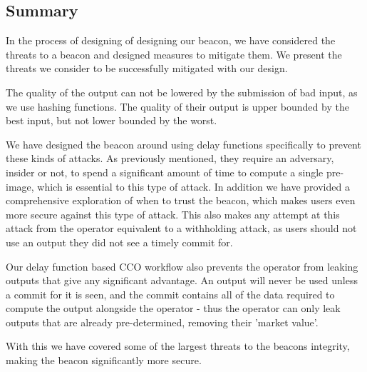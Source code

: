 \subsection{Summary}
In the process of designing of designing our beacon, we have considered the threats to a beacon and designed measures to mitigate them. We present the threats we consider to be successfully mitigated with our design.

The quality of the output can not be lowered by the submission of bad input, as we use hashing functions. The quality of their output is upper bounded by the best input, but not lower bounded by the worst.

We have designed the beacon around using delay functions specifically to prevent these kinds of attacks. As previously mentioned, they require an adversary, insider or not, to spend a significant amount of time to compute a single pre-image, which is essential to this type of attack. In addition we have provided a comprehensive exploration of when to trust the beacon, which makes users even more secure against this type of attack.
This also makes any attempt at this attack from the operator equivalent to a withholding attack, as users should not use an output they did not see a timely commit for.

Our delay function based CCO workflow also prevents the operator from leaking outputs that give any significant advantage. An output will never be used unless a commit for it is seen, and the commit contains all of the data required to compute the output alongside the operator - thus the operator can only leak outputs that are already pre-determined, removing their 'market value'.

With this we have covered some of the largest threats to the beacons integrity, making the beacon significantly more secure.
